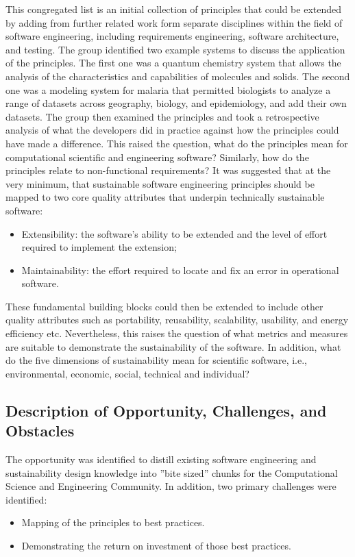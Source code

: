 This congregated list is an initial collection of principles that could be extended by adding from further related work form separate disciplines within the field of software engineering, including requirements engineering, software architecture, and testing. The group identified two example systems to discuss the application of the principles. The first one was a quantum chemistry system that allows the analysis of the characteristics and capabilities of molecules and solids. The second one was a modeling system for malaria that permitted biologists to analyze a range of datasets across geography, biology, and epidemiology, and add their own datasets. The group then examined the principles and took a retrospective analysis of what the developers did in practice against how the principles could have made a difference. This raised the question, what do the principles mean for  computational scientific and engineering software? Similarly, how do the principles relate to non-functional requirements? It was suggested that at the very minimum, that sustainable software engineering principles should be mapped to two core quality attributes that underpin technically sustainable software:
\begin{itemize}
\item Extensibility: the software's ability to be extended and the level of effort required to implement the extension;
\item Maintainability: the effort required to locate and fix an error in operational software.
\end{itemize}
These fundamental building blocks could then be extended to include other quality attributes such as portability, reusability, scalability, usability, and energy efficiency etc. Nevertheless, this raises the question of what metrics and measures are suitable to demonstrate the sustainability of the software. In addition, what do the five dimensions of sustainability mean for scientific software, i.e., environmental, economic, social, technical and individual?


\subsection{Description of Opportunity, Challenges, and Obstacles}
The opportunity was identified to distill existing software engineering and sustainability design knowledge into ''bite sized'' chunks for the Computational Science and Engineering Community. In addition, two primary challenges were identified:
\begin{itemize}
\item Mapping of the principles to best practices.
\item Demonstrating the return on investment of those best practices.
\end{itemize}


